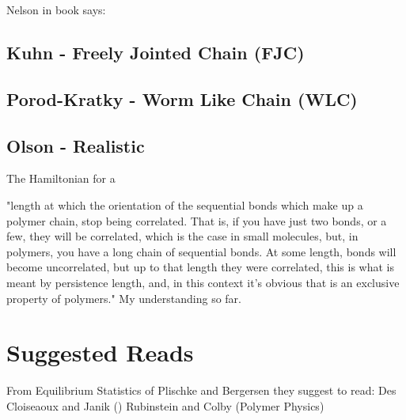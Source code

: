 Nelson in book says:



\subsection{Kuhn - Freely Jointed Chain (FJC)}

\subsection{Porod-Kratky - Worm Like Chain (WLC)}

\subsection{Olson - Realistic}

The Hamiltonian for a \cite{czapla2009}






"length at which the orientation of the sequential bonds which make up
a polymer chain, stop being correlated.  That is, if you have just two
bonds, or a  few, they will be correlated, which is  the case in small
molecules,  but, in  polymers, you  have  a long  chain of  sequential
bonds. At some length, bonds  will become uncorrelated, but up to that
length  they were  correlated, this  is what  is meant  by persistence
length,  and,  in this  context  it's  obvious  that is  an  exclusive
property of polymers." My understanding so far.





\section{Suggested Reads}

From Equilibrium Statistics of Plischke and Bergersen they suggest to
read:
Des Cloiseaoux and Janik ()
Rubinstein and Colby (Polymer Physics)

